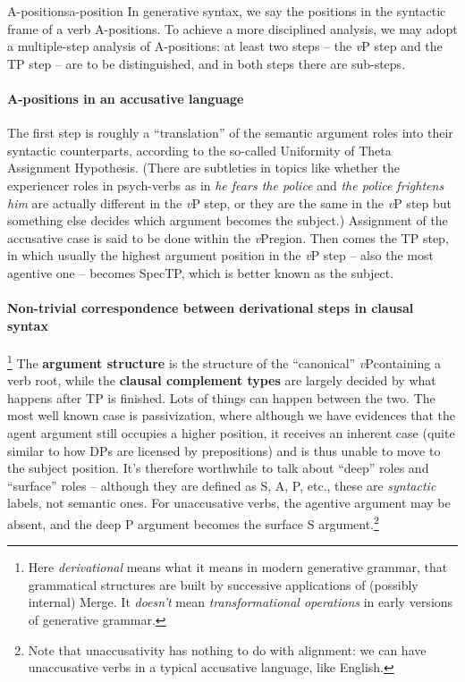 \documentclass[a4paper, oneside]{report}
\newcommand*{\concept}[1]{\textbf{#1}}
\newcommand*{\term}[1]{\emph{#1}}
\newcommand{\corpus}[1]{\emph{#1}}
\newcommand{\vP}{\textit{v}P}
\begin{document}
\begin{theorybox}{A-positions}{a-position}
    In generative syntax, 
    we say the positions in the syntactic frame of a verb A-positions.
    To achieve a more disciplined analysis, 
    we may adopt a multiple-step analysis of A-positions:
    at least two steps -- the \vP{} step and the TP step 
    -- are to be distinguished,
    and in both steps there are sub-steps.

    \paragraph*{A-positions in an accusative language} 
    The first step is roughly a ``translation'' of the semantic argument roles 
    into their syntactic counterparts,
    according to the so-called Uniformity of Theta Assignment Hypothesis.
    (There are subtleties in topics like whether 
    the experiencer roles in psych-verbs as in 
    \corpus{he fears the police} and \corpus{the police frightens him}
    are actually different in the \vP{} step,
    or they are the same in the \vP{} step but something else decides 
    which argument becomes the subject.)
    Assignment of the accusative case is said to be done within the \vP region.
    Then comes the TP step, in which
    usually the highest argument position in the \vP{} step -- also the most agentive one --
    becomes SpecTP, 
    which is better known as the subject.

    \paragraph*{Non-trivial correspondence between derivational steps in clausal syntax}%
    \footnote{
        Here \term{derivational} means what it means in modern generative grammar, 
        that grammatical structures are built by successive applications of (possibly internal) Merge.
        It \emph{doesn't} mean \emph{transformational operations}
        in early versions of generative grammar.
    }
    The \concept{argument structure} is the structure of the ``canonical'' \vP containing a verb root,
    while the \concept{clausal complement types} are largely decided by what happens after TP is finished.
    Lots of things can happen between the two.
    The most well known case is passivization,
    where although we have evidences that the agent argument still occupies a higher position,
    it receives an inherent case (quite similar to how DPs are licensed by prepositions)
    and is thus unable to move to the subject position.
    It's therefore worthwhile to talk about ``deep'' roles and ``surface'' roles
    -- although they are defined as S, A, P, etc., 
    these are \emph{syntactic} labels, not semantic ones.
    For unaccusative verbs, 
    the agentive argument may be absent, 
    and the deep P argument becomes the surface S argument.\footnote{
        Note that unaccusativity has nothing to do with alignment:
        we can have unaccusative verbs in a typical accusative language, like English.
    }


\end{theorybox}
\end{document}
